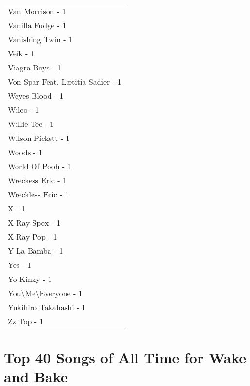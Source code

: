 \documentclass[
]{article}
\begin{document}
\begin{longtable}{l}
Van Morrison - 1 \\ 
Vanilla Fudge - 1 \\ 
Vanishing Twin - 1 \\ 
Veik - 1 \\ 
Viagra Boys - 1 \\ 
Von Spar Feat. Lætitia Sadier - 1 \\ 
Weyes Blood - 1 \\ 
Wilco - 1 \\ 
Willie Tee - 1 \\ 
Wilson Pickett - 1 \\ 
Woods - 1 \\ 
World Of Pooh - 1 \\ 
Wreckess Eric - 1 \\ 
Wreckless Eric - 1 \\ 
X - 1 \\ 
X-Ray Spex - 1 \\ 
X Ray Pop - 1 \\ 
Y La Bamba - 1 \\ 
Yes - 1 \\ 
Yo Kinky - 1 \\ 
You\textbackslash Me\textbackslash Everyone - 1 \\ 
Yukihiro Takahashi - 1 \\ 
Zz Top - 1 \\ 
 \bottomrule
\end{longtable}
\newpage

\hypertarget{top-40-songs-of-all-time-for-wake-and-bake}{%
\section{Top 40 Songs of All Time for Wake and
Bake}\label{top-40-songs-of-all-time-for-wake-and-bake}}
\end{document}
